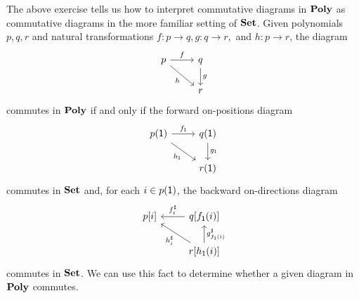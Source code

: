 \documentclass[Book-Poly]{subfiles}
\begin{document}
\begin{example} \label{ex.comm_poly}
The above exercise tells us how to interpret commutative diagrams in $\mathbf{Poly}$ as commutative diagrams in the more familiar setting of $\mathbf{Set}$.
Given polynomials $p, q, r$ and natural transformations $f \colon p \to q, g \colon q \to r,$ and $h \colon p \to r$, the diagram
\[
\begin{tikzcd}
    p \ar[r, "f"] \ar[dr, "h"'] & q \ar[d, "g"] \\
    & r
\end{tikzcd}
\]
commutes in $\mathbf{Poly}$ if and only if the forward on-positions diagram
\[
\begin{tikzcd}
    p(\1) \ar[r, "f_\1"] \ar[dr, "h_\1"'] & q(\1) \ar[d, "g_\1"] \\
    & r(\1)
\end{tikzcd}
\]
commutes in $\mathbf{Set}$ and, for each $i \in p(\textsf{1})$, the backward on-directions diagram
\[
\begin{tikzcd}
    p[i] & q[f_\1(i)] \ar[l, "f^\sharp_i"'] \\
    & r[h_\1(i)] \ar[u, "g^\sharp_{f_\1(i)}"'] \ar[ul, "h^\sharp_i"]
\end{tikzcd}
\]
commutes in $\mathbf{Set}$.
We can use this fact to determine whether a given diagram in $\mathbf{Poly}$ commutes.
\end{example}
\end{document}

